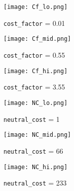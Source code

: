 
\begin{figure}[!htb]
	\begin{minipage}[t]{0.33\linewidth}
		\centering 
		\texttt{[image: Cf\_lo.png]}
		\caption{\texttt{cost_factor} = 0.01}
	\end{minipage}\hfill
	\begin{minipage}[t]{0.33\linewidth} 
		\centering 
		\texttt{[image: Cf\_mid.png]}
		\caption{\texttt{cost_factor} = 0.55}
	\end{minipage} \hfill
	\begin{minipage}[t]{0.33\linewidth} %
	 	\centering 
	 	\texttt{[image: Cf\_hi.png]}
	 	\caption{\texttt{cost_factor} = 3.55}
	\end{minipage}\hfill
\end{figure}


\begin{figure}[!htb]
	\begin{minipage}[t]{0.33\linewidth}
		\centering 
		\texttt{[image: NC\_lo.png]}
		\caption{\texttt{neutral_cost} = 1}
	\end{minipage}\hfill
	\begin{minipage}[t]{0.33\linewidth} 
		\centering 
		\texttt{[image: NC\_mid.png]}
		\caption{\texttt{neutral_cost} = 66}
	\end{minipage}\hfill 
	\begin{minipage}[t]{0.33\linewidth} %
		\centering 
		\texttt{[image: NC\_hi.png]}
		\caption{\texttt{neutral_cost} = 233}
	\end{minipage}%
\end{figure}

